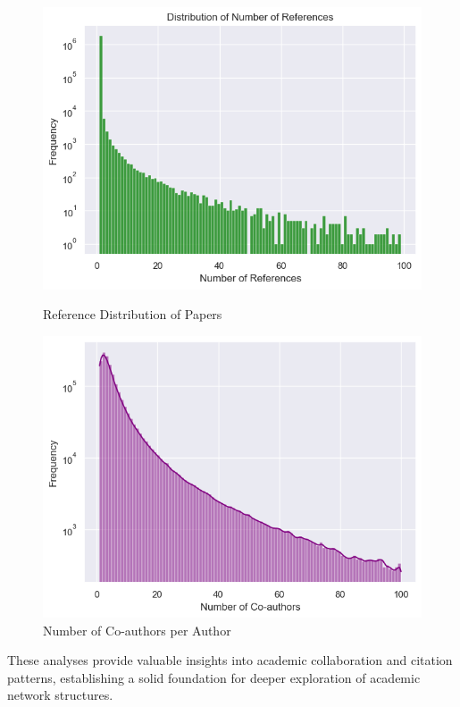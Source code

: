 \documentclass[11pt]{article}
\begin{document}
\begin{figure}[htbp]
\begin{minipage}{0.24\textwidth}
		\includegraphics[width=\textwidth]{img/preprocess/num_references.png}
		\caption{Reference Distribution of Papers}
		\label{fig:reference_distribution}
	\end{minipage} \hfill
	\begin{minipage}{0.24\textwidth}
		\includegraphics[width=\textwidth]{img/preprocess/num_coauthors.png}
		\caption{Number of Co-authors per Author}
		\label{fig:num_coauthors_per_author}
	\end{minipage}
\end{figure}

These analyses provide valuable insights into academic collaboration and citation patterns, establishing a solid foundation for deeper exploration of academic network structures.
\end{document}
